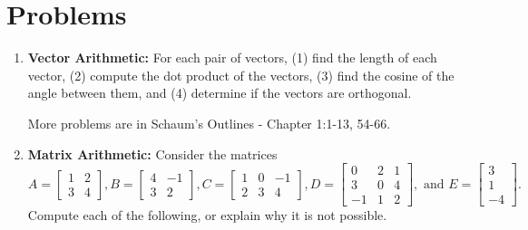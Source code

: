 \newpage





\section{Problems}


\begin{enumerate}


\item \textbf{Vector Arithmetic:} For each pair of vectors, (1) find the length of each vector, (2) compute the dot product of the vectors, (3) find the cosine of the angle between them, and (4) determine if the vectors are orthogonal.
\begin{enumerate}
\end{enumerate}
More problems are in Schaum's Outlines - 
Chapter 1:1-13,  54-66.
\item \textbf{Matrix Arithmetic:} Consider the matrices
$$
A=
\begin{bmatrix}
 1 & 2 \\
 3 & 4
\end{bmatrix}
,
B=
\begin{bmatrix}
 4 & -1 \\
 3 & 2
\end{bmatrix}
,
C=
\begin{bmatrix}
 1 & 0 & -1 \\
 2 & 3 & 4
\end{bmatrix}
,
D=
\begin{bmatrix}
 0 & 2 & 1 \\
 3 & 0 & 4 \\
 -1 & 1 & 2
\end{bmatrix}
, \text{ and }
E=
\begin{bmatrix}
 3 \\
 1 \\
 -4
\end{bmatrix}.
$$
Compute each of the following, or explain why it is not possible.

\end{enumerate}
